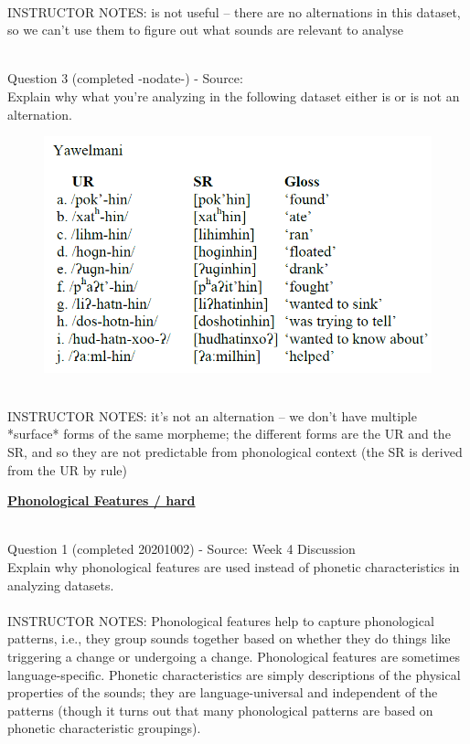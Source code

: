 \documentclass[12pt]{article}
\begin{document}
~\\
INSTRUCTOR NOTES: is not useful -- there are no alternations in this dataset, so we can't use them to figure out what sounds are relevant to analyse


~\\

{\large Question 3} (completed -nodate-) - Source: \\

Explain why what you’re analyzing in the following dataset either is or is not an alternation.\\

\begin{figure}[H]
\includegraphics{../images/yawelmani.png}
\end{figure}

~\\
INSTRUCTOR NOTES: it's not an alternation -- we don't have multiple *surface* forms of the same morpheme; the different forms are the UR and the SR, and so they are not predictable from phonological context (the SR is derived from the UR by rule)


\newpage\textbf{\underline{\huge Phonological Features / hard\\}}

~\\

{\large Question 1} (completed 20201002) - Source: Week 4 Discussion\\

Explain why phonological features are used instead of phonetic characteristics in analyzing datasets.\\


~\\
INSTRUCTOR NOTES: Phonological features help to capture phonological patterns, i.e., they group sounds together based on whether they do things like triggering a change or undergoing a change. Phonological features are sometimes language-specific. Phonetic characteristics are simply descriptions of the physical properties of the sounds; they are language-universal and independent of the patterns (though it turns out that many phonological patterns are based on phonetic characteristic groupings).
\end{document}
